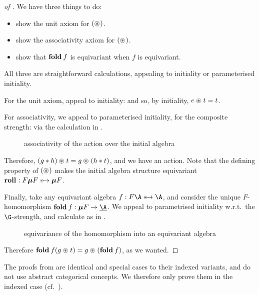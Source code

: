 \begin{proof}[of ]%
  We have three things to do:
  \begin{itemize}
    \item show the unit axiom for $(\act)$.
    \item show the associativity axiom for $(\act)$.
    \item show that $\fold f$ is equivariant when $f$ is equivariant.
  \end{itemize}
  All three are straightforward calculations, appealing to initiality
  or parameterised initiality.

  For the unit axiom, appeal to initiality:
  and so, by initiality, $\unit \act t = t$.

  For associativity, we appeal to parameterised initiality, for the
  composite strength:
  via the  calculation in .
  \begin{figure}
    \caption{associativity of the action over the initial algebra}
  \end{figure}
  Therefore, $(g \mul h) \act t = g \act (h \mul t)$, and we have
  an action. Note that the defining property of $(\act)$ makes the
  initial algebra structure equivariant $\roll : F\fix F \equito \fix F$.

  Finally, take any equivariant algebra $f : F\A \equito \A$, and
  consider the unique $F$-homomorphism $\fold f : \fix F \to
  \carrier\A$. We appeal to parametrised initiality w.r.t.~the
  $\G$-strength, and calculate as in .
  \begin{figure}
    \caption{equivariance of the homomorphism into an equivariant algebra}
  \end{figure}
  Therefore $\fold f(g \act t) = g \act (\fold f)$, as we wanted.
\end{proof}

The proofs from  are identical and special
cases to their indexed variants, and do not use abstract categorical
concepts. We therefore only prove them in the indexed case
(cf.~).

